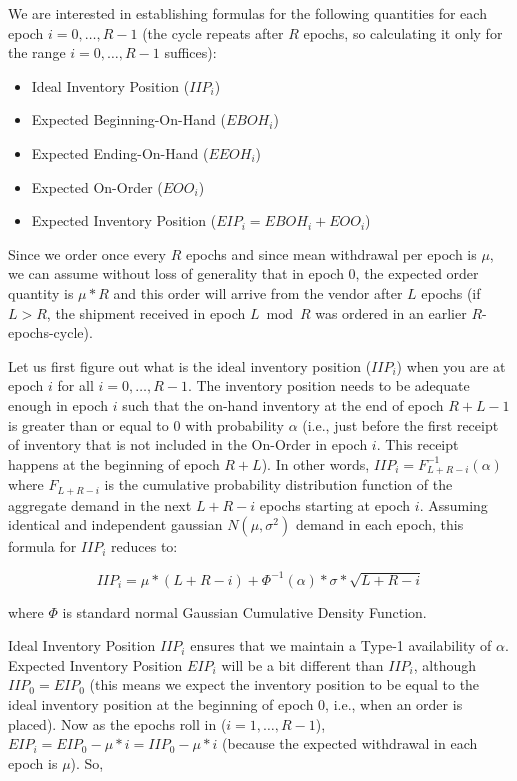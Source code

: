 \documentclass[11pt]{amsart}
\begin{document}
\begin{appendices}
We are interested in establishing formulas for the following quantities for each epoch $i = 0, \ldots, R - 1$ (the cycle repeats after $R$ epochs, so calculating it only for the range $i = 0, \ldots, R - 1$ suffices):

\begin{itemize}
\item Ideal Inventory Position ($IIP_i$)
\item Expected Beginning-On-Hand ($EBOH_i$)
\item Expected Ending-On-Hand ($EEOH_i$)
\item Expected On-Order ($EOO_i$)
\item Expected Inventory Position ($EIP_i = EBOH_i + EOO_i$)
\end{itemize}

Since we order once every $R$ epochs and since mean withdrawal per epoch is $\mu$, we can assume without loss of generality that in epoch 0, the expected order quantity is $\mu * R$ and this order will arrive from the vendor after $L$ epochs (if $L > R$, the shipment received in epoch $L \bmod R$ was ordered in an earlier $R$-epochs-cycle). 

Let us first figure out what is the ideal inventory position ($IIP_i$) when you are at epoch $i$ for all $i = 0, \ldots, R - 1$. The inventory position needs to be adequate enough in epoch $i$ such that the on-hand inventory at the end of epoch $R + L - 1$ is greater than or equal to 0 with probability $\alpha$ (i.e., just before the first receipt of inventory that is not included in the On-Order in epoch $i$. This receipt happens at the beginning of epoch $R+L$). In other words, $IIP_i = F_{L+R-i}^{-1}(\alpha)$ where $F_{L+R-i}$ is the cumulative probability distribution function of the aggregate demand in the next $L+R-i$ epochs starting at epoch $i$. Assuming identical and independent gaussian $N(\mu, \sigma^2)$ demand in each epoch, this formula for $IIP_i$ reduces to:

$$IIP_i = \mu * (L + R - i) + \Phi^{-1}(\alpha) * \sigma * \sqrt{L+R - i}$$

where $\Phi$ is standard normal Gaussian Cumulative Density Function.

Ideal Inventory Position $IIP_i$ ensures that we maintain a Type-1 availability of $\alpha$. Expected Inventory Position $EIP_i$ will be a bit different than $IIP_i$, although $IIP_0 = EIP_0$ (this means we expect the inventory position to be equal to the ideal inventory position at the beginning of epoch 0, i.e., when an order is placed). Now as the epochs roll in ($ i = 1, \ldots, R - 1$), $EIP_i = EIP_0 - \mu * i = IIP_0 - \mu * i$ (because the expected withdrawal in each epoch is $\mu$). So,


\end{appendices}
\end{document}
